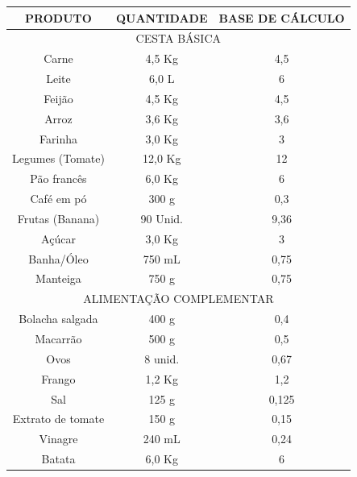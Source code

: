 \documentclass{ifto-tex}
\begin{document}
	\begin{longtable}{|c|c|c|} 
	\hline
	PRODUTO           & QUANTIDADE         & BASE DE CÁLCULO \\
	\hline
	\multicolumn{3}{|c|}{CESTA BÁSICA}                         \\
	\hline
	Carne             & 4,5 Kg             & 4,5             \\
	\hline
	Leite             & 6,0 L              & 6               \\
	\hline
	Feijão            & 4,5 Kg             & 4,5             \\
	\hline
	Arroz             & 3,6 Kg             & 3,6             \\
	\hline
	Farinha           & 3,0 Kg             & 3               \\
	\hline
	Legumes (Tomate)  & 12,0 Kg            & 12              \\
	\hline
	Pão francês       & 6,0 Kg             & 6               \\
	\hline
	Café em pó        & 300 g              & 0,3             \\
	\hline
	Frutas (Banana)   & 90 Unid.           & 9,36            \\
	\hline
	Açúcar            & 3,0 Kg             & 3               \\
	\hline
	Banha/Óleo        & 750 mL             & 0,75            \\
	\hline
	Manteiga          & 750 g              & 0,75            \\
	\hline
	\multicolumn{3}{|c|}{ALIMENTAÇÃO COMPLEMENTAR}             \\
	\hline
	Bolacha salgada   & 400 g              & 0,4             \\
	\hline
	Macarrão          & 500 g              & 0,5             \\
	\hline
	Ovos              & 8 unid.            & 0,67            \\
	\hline
	Frango            & 1,2 Kg             & 1,2             \\
	\hline
	Sal               & 125 g              & 0,125           \\
	\hline
	Extrato de tomate & 150 g              & 0,15            \\
	\hline
	Vinagre           & 240 mL             & 0,24            \\
	\hline
	Batata            & 6,0 Kg             & 6               \\

\end{longtable}
\end{document}
